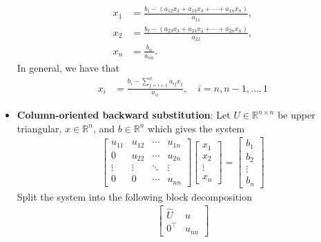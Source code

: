 \documentclass{report}
\begin{document}
\begin{itemize}
            \begin{align*}
                x_{1} &= \frac{b_{1} - (a_{12}x_{2} + a_{13}x_{3} + \cdots + a_{1n}x_{n})}{a_{11}} ,\\
                x_{2} &= \frac{b_{2} - (a_{23}x_{3} + a_{24}x_{4} + \cdots + a_{2n}x_{n})}{a_{22}} ,\\
                x_{n} &= \frac{b_{n}}{a_{nn}}
            .\end{align*}
            In general, we have that
            \begin{align*}
                x_{i} &= \frac{b_{i} - \sum_{j=i+1}^{n}a_{ij}x_{j}}{a_{ii}}, \quad i=n,n-1,...,1
            \end{align*}
        \item \textbf{Column-oriented backward substitution}:
            Let $U \in \mathbb{R}^{n\times n}$ be upper triangular, $x \in \mathbb{R}^{n}$, and $ b \in \mathbb{R}^{n}$ which gives the system
            \begin{align*}
                \begin{bmatrix}
                    u_{11} & u_{12} & \cdots & u_{1n} \\
                    0 & u_{22} & \cdots & u_{2n} \\
                    \vdots & \vdots & \ddots & \vdots \\
                    0 & 0 & \cdots & u_{nn}
                \end{bmatrix} 
                \begin{bmatrix}
                    x_{1} \\ x_{2} \\ \vdots \\ x_{n}
                \end{bmatrix}
                = 
                \begin{bmatrix}
                    b_{1} \\ b_{2} \\ \vdots \\ b_{n}
                \end{bmatrix}
            \end{align*}
            Split the system into the following block decomposition
            \begin{align*}
                \begin{bmatrix}
                    \hat{U} & u \\
                    0^{\top} & u_{nn}
                \end{bmatrix}

\end{align*}
\end{itemize}
\end{document}
